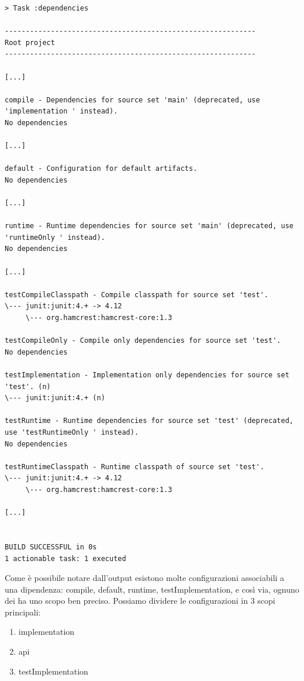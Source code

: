 \begin{verbatim}
> Task :dependencies 

------------------------------------------------------------
Root project
------------------------------------------------------------

[...]

compile - Dependencies for source set 'main' (deprecated, use 'implementation ' instead).
No dependencies

[...]

default - Configuration for default artifacts.
No dependencies

[...]

runtime - Runtime dependencies for source set 'main' (deprecated, use 'runtimeOnly ' instead).
No dependencies

[...]

testCompileClasspath - Compile classpath for source set 'test'.
\--- junit:junit:4.+ -> 4.12
     \--- org.hamcrest:hamcrest-core:1.3

testCompileOnly - Compile only dependencies for source set 'test'.
No dependencies

testImplementation - Implementation only dependencies for source set 'test'. (n)
\--- junit:junit:4.+ (n)

testRuntime - Runtime dependencies for source set 'test' (deprecated, use 'testRuntimeOnly ' instead).
No dependencies

testRuntimeClasspath - Runtime classpath of source set 'test'.
\--- junit:junit:4.+ -> 4.12
     \--- org.hamcrest:hamcrest-core:1.3

[...]


BUILD SUCCESSFUL in 0s
1 actionable task: 1 executed \end{verbatim}
Come è possibile notare dall'output esistono molte configurazioni associabili a una dipendenza: compile, default, runtime, testImplementation, e così via, ognuno dei ha uno scopo ben preciso. Possiamo dividere le configurazioni in 3 scopi principali:
\begin{enumerate}
    \item implementation
    \item api
    \item testImplementation
\end{enumerate}
